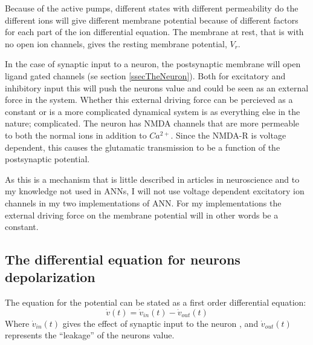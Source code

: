 
Because of the active pumps, different states with different permeability do the different ions will give different membrane potential because of different factors for each part of the ion differential equation. 
The membrane at rest, that is with no open ion channels, gives the resting membrane potential, $V_r$. 

In the case of synaptic input to a neuron, the postsynaptic membrane will open ligand gated channels (se section \ref{ssecTheNeuron}). 
Both for excitatory and inhibitory input this will push the neurons value and could be seen as an external force in the system.
Whether this external driving force can be percieved as a constant or is a more complicated dynamical system is as everything else in the nature; complicated. %
The neuron has NMDA channels that are more permeable to both the normal ions in addition to $Ca^{2+}$. Since the NMDA-R is voltage dependent, this causes the glutamatic transmission to be a function of the postsynaptic potential.

As this is a mechanism that is little described in articles in neuroscience and to my knowledge not used in ANNs, I will not use voltage dependent excitatory ion channels in my two implementations of ANN. 
For my implementations the external driving force on the membrane potential will in other words be a constant.



\subsection{The differential equation for neurons depolarization} %
The equation for the potential can be stated as a first order differential equation:
\begin{equation}
	\dot{v}(t) = \dot{v}_{in}(t) - \dot{v}_{out}(t) %
\end{equation}
Where $\dot{v}_{in}(t)$ gives the effect of synaptic input to the neuron%
	, and $\dot{v}_{out}(t)$ represents the ``leakage'' of the neurons value.



